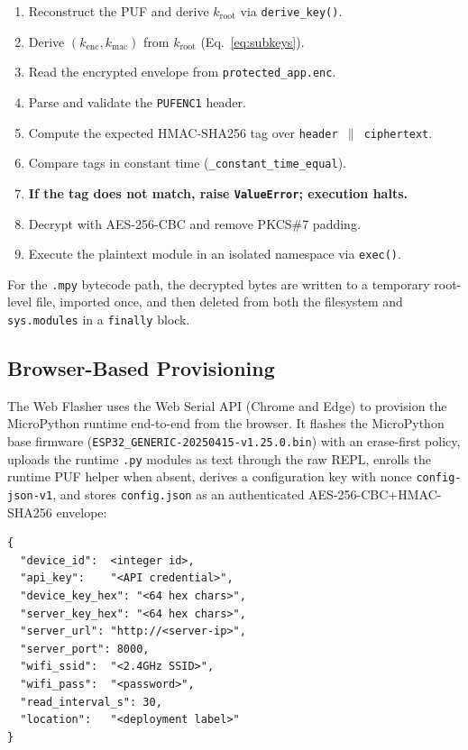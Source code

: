 \documentclass[runningheads]{llncs}
\begin{document}
\begin{enumerate}
\item Reconstruct the PUF and derive $k_{\mathrm{root}}$ via \texttt{derive\_key()}.
\item Derive $(k_{\mathrm{enc}}, k_{\mathrm{mac}})$ from $k_{\mathrm{root}}$ (Eq.~\ref{eq:subkeys}).
\item Read the encrypted envelope from \texttt{protected\_app.enc}.
\item Parse and validate the \texttt{PUFENC1} header.
\item Compute the expected HMAC-SHA256 tag over \texttt{header $\|$ ciphertext}.
\item Compare tags in constant time (\texttt{\_constant\_time\_equal}).
\item \textbf{If the tag does not match, raise \texttt{ValueError}; execution halts.}
\item Decrypt with AES-256-CBC and remove PKCS\#7 padding.
\item Execute the plaintext module in an isolated namespace via \texttt{exec()}.
\end{enumerate}

\noindent For the \texttt{.mpy} bytecode path, the decrypted bytes are written to a temporary root-level file, imported once, and then deleted from both the filesystem and \texttt{sys.modules} in a \texttt{finally} block.

\subsection{Browser-Based Provisioning}

The Web Flasher uses the Web Serial API (Chrome and Edge) to provision the MicroPython runtime end-to-end from the browser. It flashes the MicroPython base firmware (\texttt{ESP32\_GENERIC-20250415-v1.25.0.bin}) with an erase-first policy, uploads the runtime \texttt{.py} modules as text through the raw REPL, enrolls the runtime PUF helper when absent, derives a configuration key with nonce \texttt{config-json-v1}, and stores \texttt{config.json} as an authenticated AES-256-CBC+HMAC-SHA256 envelope:

\begin{lstlisting}[caption={Plaintext configuration fields encrypted before storage.}]
{
  "device_id":  <integer id>,
  "api_key":    "<API credential>",
  "device_key_hex": "<64 hex chars>",
  "server_key_hex": "<64 hex chars>",
  "server_url": "http://<server-ip>",
  "server_port": 8000,
  "wifi_ssid":  "<2.4GHz SSID>",
  "wifi_pass":  "<password>",
  "read_interval_s": 30,
  "location":   "<deployment label>"
}
\end{lstlisting}
\end{document}
